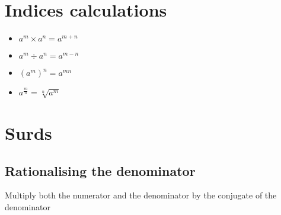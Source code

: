 \section{Indices calculations}
\begin{itemize}
    \item $a^m \times a^n = a^{m+n}$
    \item $a^m \div a^n = a^{m-n}$
    \item $(a^m)^n = a^{mn}$
    \item $a^{\frac{m}{n}} = \sqrt[n]{a^m}$
\end{itemize}

\section{Surds}
\subsection{Rationalising the denominator}
Multiply both the numerator and the denominator by the conjugate of the denominator
